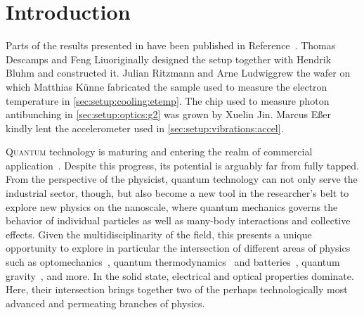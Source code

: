 \chapter{Introduction}\label{ch:setup:introduction}
\begin{partcontribs}
    Parts of the results presented in \thispart have been published in Reference~.
    Thomas Descamps and Feng Liu\sidenotemark[a] originally designed the setup together with Hendrik Bluhm and constructed it.
    Julian Ritzmann and Arne Ludwig\sidenotemark[c] grew the wafer on which Matthias Künne fabricated the sample used to measure the electron temperature in \cref{sec:setup:cooling:etemp}.
    The chip used to measure photon antibunching in \cref{sec:setup:optics:g2} was grown by Xuelin Jin.
    Marcus Eßer kindly lent the accelerometer used in \cref{sec:setup:vibrations:accel}.
\end{partcontribs}

\lettrine[lines=3,lhang=0.33,loversize=0.25,depth=1]{Q}{uantum} technology is maturing and entering the realm of commercial application~\cite{Schleich2016,Mohseni2017,QTBMBF,QTCEN,QTEU}.
Despite this progress, its potential is arguably far from fully tapped.
From the perspective of the physicist, quantum technology can not only serve the industrial sector, though, but also become a new tool in the researcher's belt to explore new physics on the nanoscale, where quantum mechanics governs the behavior of individual particles as well as many-body interactions and collective effects.
Given the multidisciplinarity of the field, this presents a unique opportunity to explore in particular the intersection of different areas of physics such as optomechanics~\cite{Aspelmeyer2014,Barzanjeh2022}, quantum thermodynamics~\cite{Goold2016,Deffner2019,Cangemi2024} and batteries~\cite{Campaioli2024}, quantum gravity~\cite{Degen2017,Bass2024}, and more.
In the solid state, electrical and optical properties dominate.
Here, their intersection brings together two of the perhaps technologically most advanced and permeating branches of physics.

